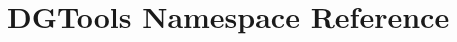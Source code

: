 \hypertarget{namespace_d_g_tools}{}\section{D\+G\+Tools Namespace Reference}
\label{namespace_d_g_tools}
